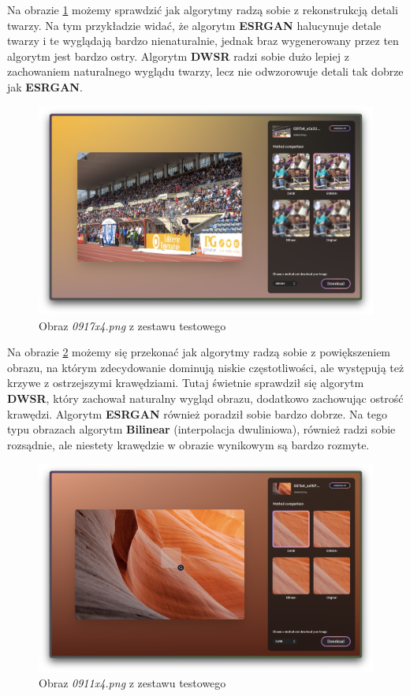 Na obrazie \ref{fig:image101} możemy sprawdzić jak algorytmy radzą sobie z rekonstrukcją detali twarzy. Na tym przykładzie widać, że algorytm \textbf{ESRGAN} halucynuje detale twarzy i te wyglądają bardzo nienaturalnie, jednak braz wygenerowany przez ten algorytm jest bardzo ostry. Algorytm \textbf{DWSR} radzi sobie dużo lepiej z zachowaniem naturalnego wyglądu twarzy, lecz nie odwzorowuje detali tak dobrze jak \textbf{ESRGAN}.

\begin{figure}[ht]
    \centering
    \includegraphics[width=0.9\linewidth]{Rozdziały/05.Porownanie_algorytmow/Obrazy/Zrzut ekranu 2023-12-12 o 14.11.49.jpg}  
    \caption{Obraz \textit{0917x4.png} z zestawu testowego \cite{guo2017deep}}
    \label{fig:image101}
\end{figure}

Na obrazie \ref{fig:image102} możemy się przekonać jak algorytmy radzą sobie z powiększeniem obrazu, na którym zdecydowanie dominują niskie częstotliwości, ale występują też krzywe z ostrzejszymi krawędziami. Tutaj świetnie sprawdził się algorytm \textbf{DWSR}, który zachował naturalny wygląd obrazu, dodatkowo zachowując ostrość krawędzi. Algorytm \textbf{ESRGAN} również poradził sobie bardzo dobrze. Na tego typu obrazach algorytm \textbf{Bilinear} (interpolacja dwuliniowa), również radzi sobie rozsądnie, ale niestety krawędzie w obrazie wynikowym są bardzo rozmyte.

\begin{figure}[H]
    \centering
    \includegraphics[width=0.9\linewidth]{Rozdziały/05.Porownanie_algorytmow/Obrazy/Zrzut ekranu 2023-12-12 o 14.12.47.jpg}  
    \caption{Obraz \textit{0911x4.png} z zestawu testowego \cite{guo2017deep}}
    \label{fig:image102}
\end{figure}

